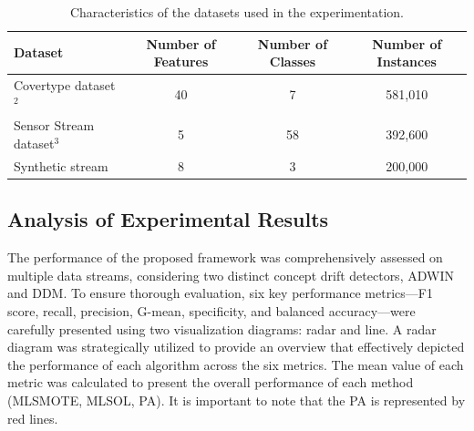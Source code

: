 \begin{table}[h!]
  \centering
  \begin{tabular}{|l|c|c|c|}
  \hline
  \textbf{Dataset} & \textbf{Number of Features} & \textbf{Number of Classes} & \textbf{Number of Instances} \\ \hline
  Covertype dataset$^2$ & 40 & 7 & 581,010 \\ \hline
  Sensor Stream dataset$^3$ & 5 & 58 & 392,600 \\ \hline
  Synthetic stream & 8 & 3 & 200,000 \\ \hline
  \end{tabular}
  \caption{Characteristics of the datasets used in the experimentation.}
  \label{tab:4_first_proposal_result_table_1}
  \end{table}

\subsection{Analysis of Experimental Results}
The performance of the proposed framework was comprehensively assessed on multiple data streams, considering two distinct concept drift detectors, ADWIN and DDM. To ensure thorough evaluation, six key performance metrics—F1 score, recall, precision, G-mean, specificity, and balanced accuracy—were carefully presented using two visualization diagrams: radar and line. A radar diagram was strategically utilized to provide an overview that effectively depicted the performance of each algorithm across the six metrics. The mean value of each metric was calculated to present the overall performance of each method (MLSMOTE, MLSOL, PA). It is important to note that the PA is represented by red lines.
